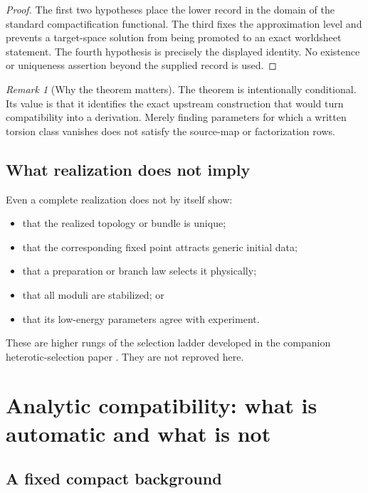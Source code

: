 \documentclass[11pt]{article}
\theoremstyle{definition}
\theoremstyle{remark}
\newtheorem{remark}[theorem]{Remark}
\begin{document}
\begin{proof}
The first two hypotheses place the lower record in the domain of the
standard compactification functional.  The third fixes the approximation
level and prevents a target-space solution from being promoted to an exact
worldsheet statement.  The fourth hypothesis is precisely the displayed
identity.  No existence or uniqueness assertion beyond the supplied record
is used.
\end{proof}

\begin{remark}[Why the theorem matters]
The theorem is intentionally conditional.  Its value is that it identifies
the exact upstream construction that would turn compatibility into a
derivation.  Merely finding parameters for which a written torsion class
vanishes does not satisfy the source-map or factorization rows.
\end{remark}

\subsection{What realization does not imply}

Even a complete realization does not by itself show:
\begin{itemize}[leftmargin=1.7em]
\item that the realized topology or bundle is unique;
\item that the corresponding fixed point attracts generic initial data;
\item that a preparation or branch law selects it physically;
\item that all moduli are stabilized; or
\item that its low-energy parameters agree with experiment.
\end{itemize}
These are higher rungs of the selection ladder developed in the companion
heterotic-selection paper \cite{NeroHeteroticSelection2026}.  They are not
reproved here.

\section{Analytic compatibility: what is automatic and what is not}
\label{sec:analytic}

\subsection{A fixed compact background}
\end{document}
